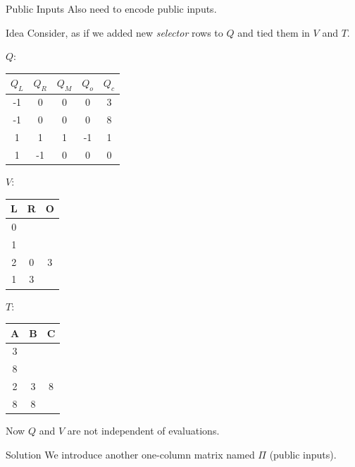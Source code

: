 \documentclass{zkdl-presentation-template}
\begin{document}
    \begin{frame}{Public Inputs}
        Also need to encode public inputs.
        \begin{block}{Idea}
            Consider, as if we added new \textit{selector} rows to $Q$ and tied them in $V$ and $T$.
        \end{block}

        \begin{example}
            \scriptsize
            \begin{center}
            $Q$: 
                \begin{tabular}{|c|c|c|c|c|}
                    \hline
                    $Q_L$ & $Q_R$ & $Q_M$ & $Q_o$ & $Q_c$ \\ 
                    \hline
                    -1 & 0 & 0 & 0 & 3 \\ 
                    \hline
                    -1 & 0 & 0 & 0 & 8 \\ 
                    \hline
                    1 & 1 & 1 & -1 & 1 \\ 
                    \hline
                    1 & -1 & 0 & 0 & 0 \\ 
                    \hline
                \end{tabular}
            \quad $V$:
                \begin{tabular}{|c|c|c|}
                    \hline
                    L & R & O \\
                    \hline
                    0 &  &  \\
                    \hline
                    1 &  &  \\
                    \hline
                    2 & 0 & 3 \\
                    \hline
                    1 & 3 &  \\
                    \hline
                \end{tabular}
             \quad $T$:
                \begin{tabular}{|c|c|c|}
                    \hline
                    A & B & C \\
                    \hline
                    3 &  &  \\
                    \hline
                    8 &  &  \\
                    \hline
                    2 & 3 & 8 \\
                    \hline
                    8 & 8 &  \\
                    \hline
                \end{tabular}
            \end{center}
        \end{example}

         Now $Q$ and $V$ are not independent of evaluations. 
        \begin{block}{Solution}
            We introduce another one-column matrix named $\Pi$ (public inputs).
        \end{block}
    \end{frame}
\end{document}

